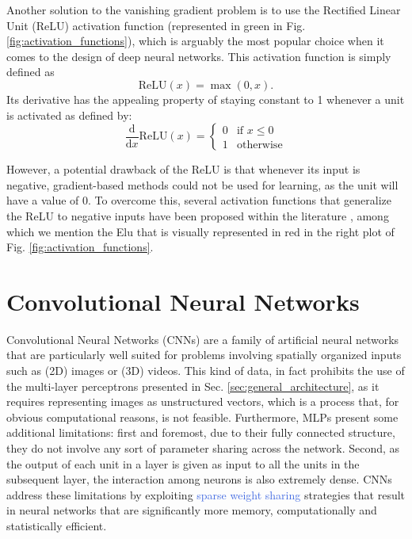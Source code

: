 Another solution to the vanishing gradient problem is to use the Rectified Linear Unit (ReLU) activation function (represented in green in Fig. \ref{fig:activation_functions}), which is arguably the most popular choice when it comes to the design of deep neural networks. This activation function is simply defined as
\begin{equation}
	\text{ReLU}(x) = \max(0,x).
\end{equation}
Its derivative has the appealing property of staying constant to 1 whenever a unit is activated as defined by: 
\begin{equation}
	\frac{\text{d}}{\text{d}x} \text{ReLU}(x) = \begin{cases} 0 & \text{if } x \leq 0 \\ 1 & \text{otherwise} \end{cases}
\end{equation}

However, a potential drawback of the ReLU is that whenever its input is negative, gradient-based methods could not be used for learning, as the unit will have a value of $0$. To overcome this, several activation functions that generalize the ReLU to negative inputs have been proposed within the literature \cite{clevert2015fast, maas2013rectifier, he2015delving}, among which we mention the Elu \cite{clevert2015fast} that is visually represented in red in the right plot of Fig. \ref{fig:activation_functions}. 


\section{Convolutional Neural Networks}
\label{sec:convolutional_networks}

Convolutional Neural Networks (CNNs) are a family of artificial neural networks that are particularly well suited for problems involving spatially organized inputs such as (2D) images or (3D) videos. This kind of data, in fact prohibits the use of the multi-layer perceptrons presented in Sec. \ref{sec:general_architecture}, as it requires representing images as unstructured vectors, which is a process that, for obvious computational reasons, is not feasible. Furthermore, MLPs present some additional limitations: first and foremost, due to their fully connected structure, they do not involve any sort of parameter sharing across the network. Second, as the output of each unit in a layer is given as input to all the units in the subsequent layer, the interaction among neurons is also extremely dense. CNNs address these limitations by exploiting \textcolor{RoyalBlue}{sparse weight sharing} strategies that result in neural networks that are significantly more memory, computationally and statistically efficient. 

